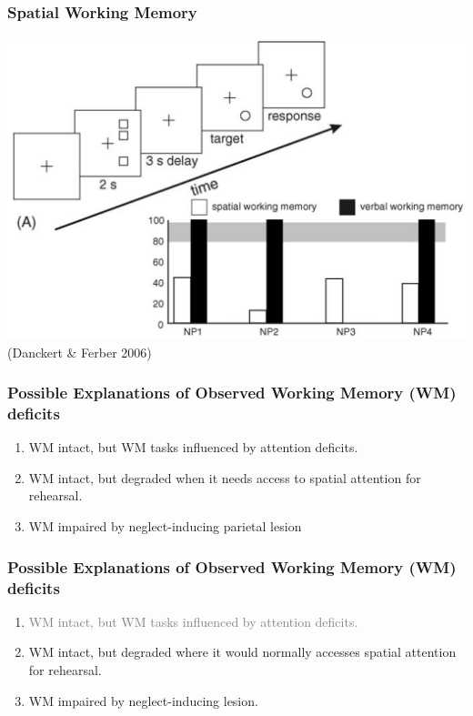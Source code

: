\documentclass{beamer}
\begin{document}

\begin{frame}
	\frametitle{Possible Explanations of Observed Working Memory (WM) deficits}
	\begin{enumerate}
		\item WM intact, but WM tasks influenced by attention deficits.
		\item WM intact, but degraded when it needs access to spatial attention for rehearsal.
		\item WM impaired by neglect-inducing parietal lesion
	\end{enumerate}
\end{frame}

\begin{frame}
	\frametitle{Possible Explanations of Observed Working Memory (WM) deficits}
	\begin{enumerate}
		\item \textcolor{gray}{WM intact, but WM tasks influenced by attention deficits.}
		\item WM intact, but degraded where it would normally accesses spatial attention for rehearsal.
		\item WM impaired by neglect-inducing lesion.
	\end{enumerate}
\end{frame}

\end{document}
